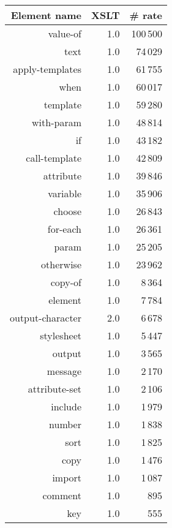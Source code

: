 \begin{tabular}{|r|r|r|}
\hline
\bf Element name&\bf XSLT&\bf \# rate\\
\hline
value-of&1.0&100\,500\\
\hline
text&1.0&74\,029\\
\hline
apply-templates&1.0&61\,755\\
\hline
when&1.0&60\,017\\
\hline
template&1.0&59\,280\\
\hline
with-param&1.0&48\,814\\
\hline
if&1.0&43\,182\\
\hline
call-template&1.0&42\,809\\
\hline
attribute&1.0&39\,846\\
\hline
variable&1.0&35\,906\\
\hline
choose&1.0&26\,843\\
\hline
for-each&1.0&26\,361\\
\hline
param&1.0&25\,205\\
\hline
otherwise&1.0&23\,962\\
\hline
copy-of&1.0&8\,364\\
\hline
element&1.0&7\,784\\
\hline
output-character&2.0&6\,678\\
\hline
stylesheet&1.0&5\,447\\
\hline
output&1.0&3\,565\\
\hline
message&1.0&2\,170\\
\hline
attribute-set&1.0&2\,106\\
\hline
include&1.0&1\,979\\
\hline
number&1.0&1\,838\\
\hline
sort&1.0&1\,825\\
\hline
copy&1.0&1\,476\\
\hline
import&1.0&1\,087\\
\hline
comment&1.0&895\\
\hline
key&1.0&555\\
\hline
\end{tabular}
